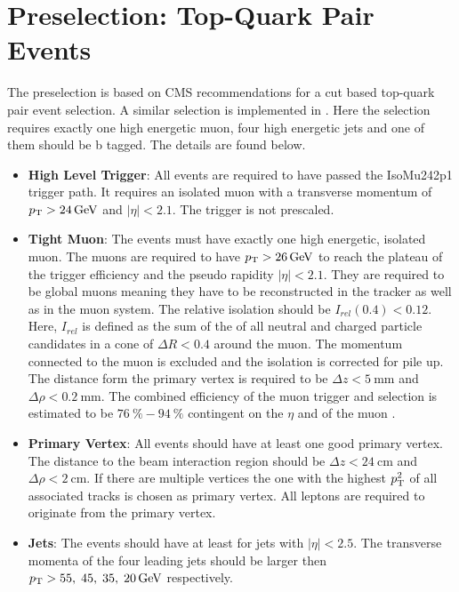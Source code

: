 \section{Preselection: Top-Quark Pair Events}

The preselection is based on CMS recommendations for a cut based top-quark pair event selection. A similar selection is implemented in \cite{CMS-PAS-TOP-12-027}. Here the selection requires exactly one high energetic muon, four high energetic jets and one of them should be b tagged. The details are found below.

\begin{itemize}
\item \textbf{High Level Trigger}: All events are required to have passed the IsoMu242p1 trigger path. It requires an isolated muon with a transverse momentum of $p_{\mathrm{T}} > \SI{24}{\giga \electronvolt}$ and $| \eta | < 2.1$. The trigger is not prescaled.
\item \textbf{Tight Muon}: The events must have exactly one high energetic, isolated muon. The muons are required to have  $p_{\mathrm{T}} > \SI{26}{\giga \electronvolt}$ to reach the plateau of the trigger efficiency and the pseudo rapidity $| \eta | <2.1 $. They are required to be global muons meaning they have to be reconstructed in the tracker as well as in the muon system. The relative isolation should be $I_{rel}(0.4) < 0.12$. Here, $I_{rel}$ is defined as the sum of the \pt of all neutral and charged particle candidates in a cone of $\Delta R < 0.4$ around the muon. The momentum connected to the muon is excluded and the isolation is corrected for pile up. The distance form the primary vertex is required to be $\Delta z < \SI{5}{\milli \meter}$ and $\Delta \rho < \SI{0.2}{\milli \meter}$. The combined efficiency of the muon trigger and selection is estimated to be $\SI{76}{\percent}-\SI{94}{\percent}$ contingent on the $\eta$ and \pt of the muon \cite{CMS-DP-2013-009} \cite{Chatrchyan:2012xi}.
\item \textbf{Primary Vertex}: All events should have at least one good primary vertex. The distance to the beam interaction region should be $\Delta z < \SI{24}{\centi \meter}$ and $\Delta \rho < \SI{2}{\centi \meter}$. If there are multiple vertices the one with the highest $p_{\mathrm{T}}^2$ of all associated tracks is chosen as primary vertex. All leptons are required to originate from the primary vertex.
\item \textbf{Jets}: The events should have at least for jets with $| \eta | < 2.5$. The transverse momenta of the four leading jets should be larger then $p_{\mathrm{T}} > 55,\; 45,\; 35, \; \SI{20}{\giga \electronvolt}$ respectively. 

\end{itemize}
